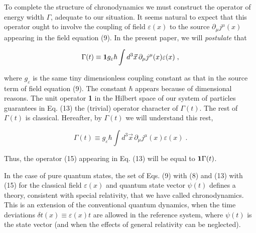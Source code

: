 \documentclass[a4paper,12pt]{article}
\begin{document}
To complete the structure of chronodynamics we must construct the operator of energy width $\Gamma $, adequate to our situation. It seems natural to expect that this operator ought to involve the coupling of field $\varepsilon(x)$ to the source $\partial_\mu j^\mu (x)$ appearing in the field equation (9). In the present paper, we will {\it postulate} that 

\begin{equation}
\Gamma(t) \equiv {\bf 1} g_\varepsilon \hbar \int d^3\vec{x}\,\partial_\mu j^\mu(x) \varepsilon(x)\;, 
\end{equation}

\ni where $g_\varepsilon $ is the same tiny dimensionless coupling constant as that in the source term of field equation (9). The constant $\hbar$ appears because of dimensional reasons. The unit operator {\bf 1} in the Hilbert space of our system of particles guarantees in Eq. (13) the (trivial) operator character of $\Gamma (t)$. The rest of $\Gamma (t)$ is classical. Hereafter, by $\Gamma (t)$  we will understand this rest,

\begin{equation}
\Gamma (t) \equiv g_\varepsilon \hbar \int d^3\vec{x}\,\partial_\mu j^\mu(x) \varepsilon(x)\;.
\end{equation}

\ni Thus, the operator (15) appearing in Eq. (13) will be equal to ${\bf 1}\Gamma (t)$.

In the case of pure quantum states, the set of Eqs. (9) with (8) and (13) with (15) for the classical field $\varepsilon (x)$ and quantum state vector $\psi (t)$ defines a theory, consistent with special relativity, that we have called chronodynamics. This is an extension of the conventional quantum dynamics, when the time deviations $\delta t(x) \equiv \varepsilon (x) t$ are allowed in the reference system, where $\psi (t)$ is the state vector (and when the effects of general relativity can be neglected).
\end{document}
